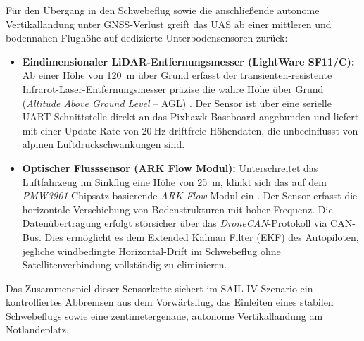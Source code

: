 Für den Übergang in den Schwebeflug sowie die anschließende autonome Vertikallandung unter GNSS-Verlust greift das UAS ab einer mittleren und bodennahen Flughöhe auf 
dedizierte Unterbodensensoren zurück:

\begin{itemize}
    \item \textbf{Eindimensionaler LiDAR-Entfernungsmesser (LightWare SF11/C):} Ab einer Höhe von \SI{120}{\m} über Grund erfasst der transienten-resistente 
                                                                                Infrarot-Laser-Entfernungsmesser präzise die wahre Höhe über Grund 
                                                                                (\textit{Altitude Above Ground Level} -- AGL) \cite{lightware_sf11c}. Der Sensor ist über 
                                                                                eine serielle UART-Schnittstelle direkt an das Pixhawk-Baseboard angebunden und liefert 
                                                                                mit einer Update-Rate von $\SI{20}{\Hz}$ driftfreie Höhendaten, die unbeeinflusst von 
                                                                                alpinen Luftdruckschwankungen sind.
    \item \textbf{Optischer Flusssensor (ARK Flow Modul):} Unterschreitet das Luftfahrzeug im Sinkflug eine Höhe von \SI{25}{\m}, klinkt sich das auf dem 
                                                           \textit{PMW3901}-Chipsatz basierende \textit{ARK Flow}-Modul ein \cite{ark_flow}. Der Sensor erfasst die 
                                                           horizontale Verschiebung von Bodenstrukturen mit hoher Frequenz. Die Datenübertragung erfolgt störsicher 
                                                           über das \textit{DroneCAN}-Protokoll via CAN-Bus. Dies ermöglicht es dem Extended Kalman Filter (EKF) des Autopiloten, 
                                                           jegliche windbedingte Horizontal-Drift im Schwebeflug ohne Satellitenverbindung vollständig zu eliminieren.
\end{itemize}

Das Zusammenspiel dieser Sensorkette sichert im SAIL-IV-Szenario ein kontrolliertes Abbremsen aus dem Vorwärtsflug, das Einleiten eines stabilen Schwebeflugs sowie eine 
zentimetergenaue, autonome Vertikallandung am Notlandeplatz.

